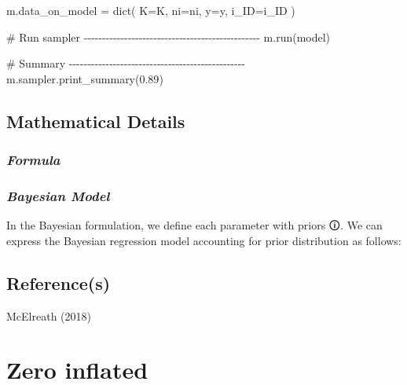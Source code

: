 \documentclass[
  letterpaper,
  DIV=11,
  numbers=noendperiod]{scrreprt}
\newenvironment{Shaded}{\begin{snugshade}}{\end{snugshade}}
\newcommand{\BuiltInTok}[1]{\textcolor[rgb]{0.00,0.23,0.31}{#1}}
\newcommand{\CommentTok}[1]{\textcolor[rgb]{0.37,0.37,0.37}{#1}}
\newcommand{\FloatTok}[1]{\textcolor[rgb]{0.68,0.00,0.00}{#1}}
\newcommand{\NormalTok}[1]{\textcolor[rgb]{0.00,0.23,0.31}{#1}}
\newcommand{\OperatorTok}[1]{\textcolor[rgb]{0.37,0.37,0.37}{#1}}
\begin{document}
\begin{Shaded}
\begin{Highlighting}[]
\NormalTok{m.data\_on\_model }\OperatorTok{=} \BuiltInTok{dict}\NormalTok{(}
\NormalTok{    K}\OperatorTok{=}\NormalTok{K,}
\NormalTok{    ni}\OperatorTok{=}\NormalTok{ni,}
\NormalTok{    y}\OperatorTok{=}\NormalTok{y,}
\NormalTok{    i\_ID}\OperatorTok{=}\NormalTok{i\_ID}
\NormalTok{)}

\CommentTok{\# Run sampler {-}{-}{-}{-}{-}{-}{-}{-}{-}{-}{-}{-}{-}{-}{-}{-}{-}{-}{-}{-}{-}{-}{-}{-}{-}{-}{-}{-}{-}{-}{-}{-}{-}{-}{-}{-}{-}{-}{-}{-}{-}{-}{-}{-}{-}{-}{-}{-} }
\NormalTok{m.run(model)  }

\CommentTok{\# Summary {-}{-}{-}{-}{-}{-}{-}{-}{-}{-}{-}{-}{-}{-}{-}{-}{-}{-}{-}{-}{-}{-}{-}{-}{-}{-}{-}{-}{-}{-}{-}{-}{-}{-}{-}{-}{-}{-}{-}{-}{-}{-}{-}{-}{-}{-}{-}{-}}
\NormalTok{m.sampler.print\_summary(}\FloatTok{0.89}\NormalTok{)}
\end{Highlighting}
\end{Shaded}

\section{Mathematical Details}\label{mathematical-details-9}

\subsection{\texorpdfstring{\emph{Formula}}{Formula}}\label{formula-3}

\subsection{\texorpdfstring{\emph{Bayesian
Model}}{Bayesian Model}}\label{bayesian-model-3}

In the Bayesian formulation, we define each parameter with
\label{prior}{{priors 🛈}}. We can express the Bayesian
regression model accounting for prior distribution as follows:

\section{Reference(s)}\label{references-9}

McElreath (2018)


\chapter{Zero inflated}\label{zero-inflated}
\end{document}
